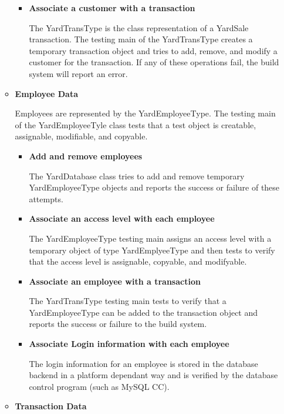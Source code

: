 \documentclass{report}
\begin{document}
\begin{itemize}
\begin{itemize}
\begin{itemize}
		  \item{\textbf{Associate a customer with a transaction}}

		  The YardTransType is the class representation of a YardSale transaction.  The testing main of the
		YardTransType creates a temporary transaction object and tries to add, remove, and modify a customer
		for the transaction.  If any of these operations fail, the build system will report an error.

                \end{itemize}
                \item {\textbf{Employee Data}}

			Employees are represented by the YardEmployeeType.  The testing main of the YardEmployeeTyle class
			tests that a test object is creatable, assignable, modifiable, and copyable.

                \begin{itemize}
                    \item{\textbf{Add and remove employees}}

		    	The YardDatabase class tries to add and remove temporary YardEmployeeType objects and reports
			the success or failure of these attempts.

                    \item{\textbf{Associate an access level with each employee}}

			The YardEmployeeType testing main assigns an access level with a temporary object of type
			YardEmplyeeType and then tests to verify that the access level is assignable, copyable, and
			modifyable.

                    \item{\textbf{Associate an employee with a transaction}}

		    	The YardTransType testing main tests to verify that a YardEmployeeType can be added to the
			transaction object and reports the success or failure to the build system.

                    \item{\textbf{Associate Login information with each employee}}

		    The login information for an employee is stored in the database backend in a platform dependant way
		    and is verified by the database control program (such as MySQL CC).
                \end{itemize}
                \item{\textbf{Transaction Data}}


\end{itemize}
\end{itemize}
\end{document}

